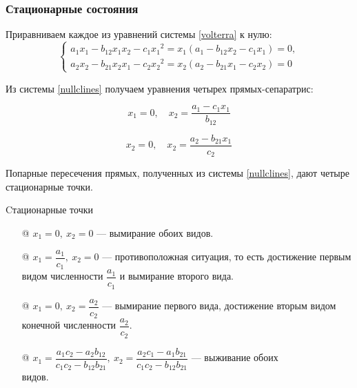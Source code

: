 \documentclass[unicode]{beamer}
\makeatletter
\newcommand*{\rom}[1]{\expandafter\@slowromancap\romannumeral #1@}
\makeatother
\begin{document}
    \begin{frame}
        \frametitle{Стационарные состояния}

        Приравниваем каждое из уравнений системы \eqref{volterra} к нулю:
        \begin{equation}
            \label{nullclines}
            \begin{cases}
                a_1 x_1 - b_{12} x_1 x_2 - c_1 {x_1}\!^2 = x_1 (a_1 - b_{12} x_2 - c_1 x_1) = 0,
                \\[0.3em]
                a_2 x_2 - b_{21} x_2 x_1 - c_2 {x_2}\!^2 = x_2 (a_2 - b_{21} x_1 - c_2 x_2) = 0
            \end{cases}
        \end{equation}

        Из системы \eqref{nullclines} получаем уравнения четырех прямых-сепаратрис:
        \begin{block}{}
            \[
                x_1 = 0,\quad x_2 = \dfrac{a_1 - c_1 x_1}{b_{12}}
            \]
        \end{block}

        \begin{block}{}
            \[
                x_2 = 0,\quad x_2 = \dfrac{a_2 - b_{21} x_1}{c_2}
            \]
        \end{block}
    \end{frame}

    \begin{frame}
        Попарные пересечения прямых, полученных из системы \eqref{nullclines}, дают четыре стационарные точки.
        \begin{block}{Cтационарные точки}
            \begin{enumerate}
                \setlength\itemsep{0.6em}
                \item[{\rom 1}] $ x_1 = 0,\ x_2 = 0 $ --- вымирание обоих видов.
                \item[{\rom 2}] $ x_1 = \dfrac{a_1}{c_1},\ x_2 = 0 $ --- противоположная ситуация, то есть достижение первым видом численности $ \dfrac{a_1}{c_1} $ и вымирание второго вида.
                \item[{\rom 3}] $ x_1 = 0,\ x_2 = \dfrac{a_2}{c_2} $ --- вымирание первого вида, достижение вторым видом конечной численности $ \dfrac{a_2}{c_2} $.
                \item[{\rom 4}] $ x_1 = \dfrac{a_1 c_2 - a_2 b_{12}}{c_1 c_2 - b_{12} b_{21}},\ x_2 = \dfrac{a_2 c_1 - a_1 b_{21}}{c_1 c_2 - b_{12} b_{21}}$ --- выживание обоих \\[0.5em] видов.
            \end{enumerate} 
        \end{block}
    \end{frame}
\end{document}

